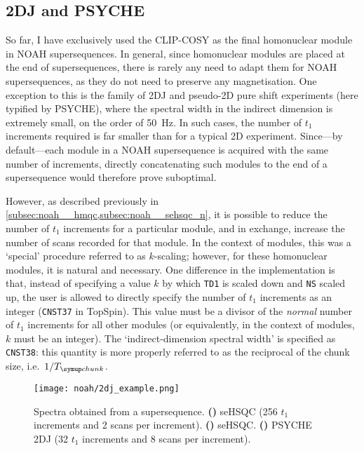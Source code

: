 \subsection{2DJ and PSYCHE}
\label{subsec:noah__2djpsyche}

So far, I have exclusively used the CLIP-COSY as the final homonuclear module in NOAH supersequences.
In general, since homonuclear modules are placed at the end of supersequences, there is rarely any need to adapt them for NOAH supersequences, as they do not need to preserve any magnetisation.
One exception to this is the family of 2DJ and pseudo-2D pure shift experiments (here typified by PSYCHE), where the spectral width in the indirect dimension is extremely small, on the order of \qty{50}{\Hz}.
In such cases, the number of $t_1$ increments required is far smaller than for a typical 2D experiment.
Since---by default---each module in a NOAH supersequence is acquired with the same number of increments, directly concatenating such modules to the end of a supersequence would therefore prove suboptimal.

However, as described previously in \cref{subsec:noah__hmqc,subsec:noah__sehsqc_n}, it is possible to reduce the number of $t_1$ increments for a particular module, and in exchange, increase the number of scans recorded for that module.
In the context of \nitrogen{} modules, this was a `special' procedure referred to as $k$-scaling; however, for these homonuclear modules, it is natural and necessary.
One difference in the implementation is that, instead of specifying a value $k$ by which \texttt{TD1} is scaled down and \texttt{NS} scaled up, the user is allowed to directly specify the number of $t_1$ increments as an integer (\texttt{CNST37} in TopSpin).
This value must be a divisor of the \textit{normal} number of $t_1$ increments for all other modules (or equivalently, in the context of \nitrogen{} modules, $k$ must be an integer).
The `indirect-dimension spectral width' is specified as \texttt{CNST38}: this quantity is more properly referred to as the reciprocal of the chunk size, i.e.\ $1/\Tchunk$.

\begin{figure}[!ht]
    \centering
    \texttt{[image: noah/2dj\_example.png]}%
    {\label{fig:2dj_example_spn}}%
    {\label{fig:2dj_example_spc}}%
    {\label{fig:2dj_example_j}}%
    \caption[Spectra from a  supersequence]{
        Spectra obtained from a  supersequence.
        \textbf{()} \nitrogen{} seHSQC (256 $t_1$ increments and 2 scans per increment).
        \textbf{()} \carbon{} seHSQC.
        \textbf{()} PSYCHE 2DJ (32 $t_1$ increments and 8 scans per increment).
    }
    \label{fig:2dj_example}
\end{figure}

